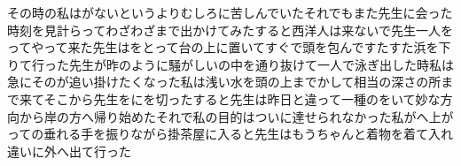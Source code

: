 \documentclass[a4j,twocolumn]{tarticle}
\begin{document}
その時の私はがないというよりむしろに苦しんでいた\。それでもまた先生に会った時刻を見計らって\、わざわざまで出かけてみた\。すると西洋人は来ないで先生一人をってやって来た\。先生はをとって台の上に置いて\、すぐで頭を包んで\、すたすた浜を下りて行った\。先生が昨のように騒がしいの中を通り抜けて\、一人で泳ぎ出した時\、私は急にそのが追い掛けたくなった\。私は浅い水を頭の上までかして相当の深さの所まで来て\、そこから先生をにを切った\。すると先生は昨日と違って\、一種のをいて\、妙な方向から岸の方へ帰り始めた\。それで私の目的はついに達せられなかった\。私がへ上がっての垂れる手を振りながら掛茶屋に入ると\、先生はもうちゃんと着物を着て入れ違いに外へ出て行った\。
\end{document}
